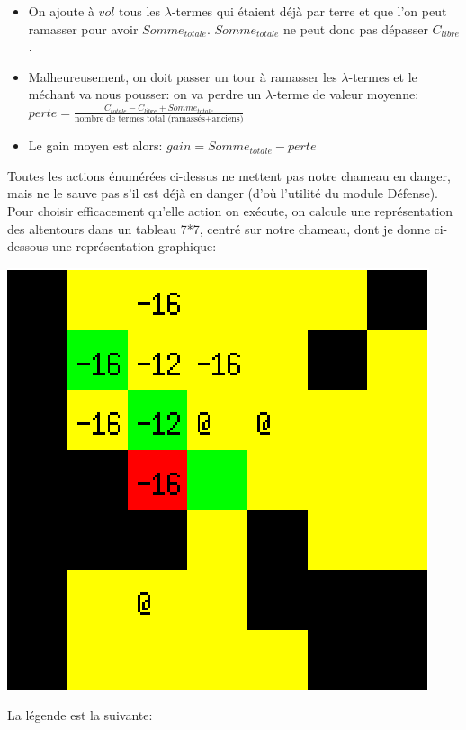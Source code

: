 \documentclass[a4paper,12pt]{article}
\begin{document}
\begin{enumerate}
\begin{itemize}
\item On ajoute \`a $vol$ tous les $\lambda$-termes qui \'etaient d\'ej\`a par terre et que l'on peut ramasser pour avoir $Somme_{totale}$. $Somme_{totale}$ ne peut donc pas d\'epasser $C_{libre}$.
\item Malheureusement, on doit passer un tour \`a ramasser les $\lambda$-termes et le m\'echant va nous pousser: on va perdre un $\lambda$-terme de valeur moyenne:\\ $perte=\displaystyle{\frac{C_{totale}-C_{libre}+Somme_{totale}}{\textrm{nombre de termes total (ramass\'es+anciens)}}}$
\item Le gain moyen est alors: $gain=Somme_{totale}-perte$
\end{itemize}
\end{enumerate}
Toutes les actions \'enum\'er\'ees ci-dessus ne mettent pas notre chameau en danger, mais ne le sauve pas s'il est d\'ej\`a en danger (d'o\`u l'utilit\'e du module D\'efense). Pour choisir efficacement qu'elle action on ex\'ecute, on calcule une repr\'esentation des altentours dans un tableau 7*7, centr\'e sur notre chameau, dont je donne ci-dessous une repr\'esentation graphique:
\begin{center}
\includegraphics[scale=0.6]{./alentours.eps}
\end{center}
La l\'egende est la suivante:
\end{document}
